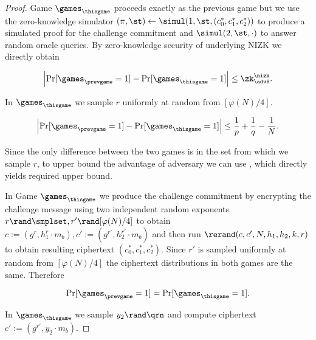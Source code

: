 \begin{proof}
Game $\games_\thisgame$ proceeds exactly as the previous game but we use the zero-knowledge simulator $(\pi, \st) \leftarrow \simul(1, \st, (c_0^*,c_1^*,c_2^*))$ to produce a simulated proof for the challenge commitment and $\simul(2, \st, \cdot)$ to answer random oracle queries. By zero-knowledge security of underlying NIZK we directly obtain
\begin{lemma}\label{nitc:flem}
\[
\left|\Pr[\games_\prevgame = 1] - \Pr[\games_\thisgame = 1]\right| \leq \zk^\nizk_\advB.
\]
\end{lemma}

In $\games_\thisgame$ we sample $r$ uniformly at random from $[\varphi(N)/4]$. 

\begin{lemma}
\[
\left|\Pr[\games_\prevgame = 1] - \Pr[\games_\thisgame = 1]\right| \leq \frac{1}{p}+\frac{1}{q}-\frac{1}{N}.
\]
\end{lemma}
Since the only difference between the two games is in the set from which we sample $r$, to upper bound the advantage of adversary we can use , which directly yields required upper bound.

In Game $\games_\thisgame$ we produce the challenge commitment by encrypting the challenge message using two independent random exponents $r \rand \smplset, r' \rand [\varphi(N)/4]$ to obtain $c:= (g^{r}, h_1^{r}\cdot m_b), c':= (g^{r'}, h_2^{r'}\cdot m_b)$ and then run $\rerand(c,c',N, \allowbreak h_1, h_2,k,r)$ to obtain resulting ciphertext $(c_0^*, c_1^*, c_2^*)$. Since $r'$ is sampled uniformly at random from $[\varphi(N)/4]$ the ciphertext distributions in both games  are the same. Therefore 

\begin{lemma}
\[
\Pr[\games_\prevgame = 1] = \Pr[\games_\thisgame = 1].
\]
\end{lemma}


In $\games_\thisgame$ we sample $y_2 \rand \qrn$ and compute ciphertext $c':= (g^{r'}, y_2 \cdot m_b)$.


\end{proof}
